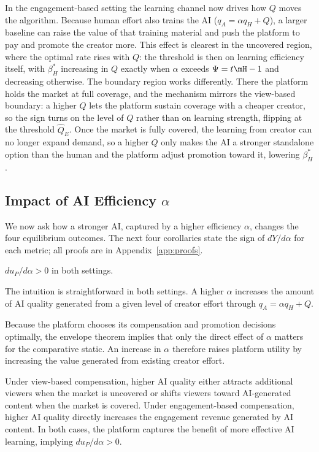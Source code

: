 In the engagement-based setting the learning channel now drives how $Q$ moves
the algorithm. Because human effort also trains the AI ($q_A = \alpha q_H + Q$),
a larger baseline can raise the value of that training material and push the
platform to pay and promote the creator more. This effect is clearest in the
uncovered region, where the optimal rate rises with $Q$: the threshold is then
on learning efficiency itself, with $\beta_H^*$ increasing in $Q$ exactly when
$\alpha$ exceeds $\Psi = t\mH - 1$ and decreasing otherwise. The boundary region
works differently. There the platform holds the market at full coverage, and the
mechanism mirrors the view-based boundary: a higher $Q$ lets the platform sustain
coverage with a cheaper creator, so the sign turns on the level of $Q$ rather
than on learning strength, flipping at the threshold $\widehat Q_E$. Once the market is fully covered, the learning from creator can no longer expand
demand, so a higher $Q$ only makes the AI a stronger standalone option than the
human and the platform adjust promotion toward it, lowering $\beta_H^*$.



\subsection{Impact of AI Efficiency $\alpha$}

We now ask how a stronger AI, captured by a higher efficiency
$\alpha$, changes the four equilibrium outcomes. 
The next four corollaries
state the sign of $dY/d\alpha$ for each metric; all proofs are in
Appendix~\ref{app:proofs}.

\begin{corollary}\label{cor:alpha_up}
$du_P/d\alpha > 0$ in both settings.
\end{corollary}

The intuition is straightforward in both settings. A higher $\alpha$ increases the amount of AI quality generated from a given level of creator effort through $q_A=\alpha q_H+Q$. 

Because the platform chooses its compensation and promotion decisions optimally, the envelope theorem implies that only the direct effect of $\alpha$ matters for the comparative static. An increase in $\alpha$ therefore raises platform utility by increasing the value generated from existing creator effort.

Under view-based compensation, higher AI quality either attracts additional viewers when the market is uncovered or shifts viewers toward AI-generated content when the market is covered. Under engagement-based compensation, higher AI quality directly increases the engagement revenue generated by AI content. In both cases, the platform captures the benefit of more effective AI learning, implying $du_P/d\alpha>0$.


